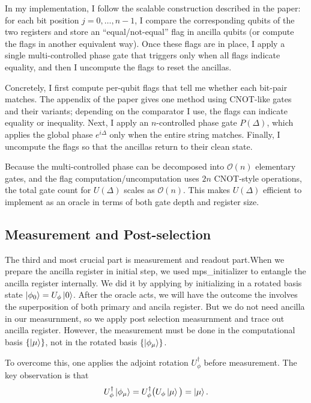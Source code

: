 \documentclass[12pt,a4paper]{article}
\begin{document}
\setlength{\parskip}{1em}
In my implementation, I follow the scalable construction described in the paper: for each bit position $j = 0, \dots, n-1$, I compare the corresponding qubits of the two registers and store an ``equal/not-equal'' flag in ancilla qubits (or compute the flags in another equivalent way). Once these flags are in place, I apply a single multi-controlled phase gate that triggers only when all flags indicate equality, and then I uncompute the flags to reset the ancillas.  

Concretely, I first compute per-qubit flags that tell me whether each bit-pair matches. The appendix of the paper gives one method using CNOT-like gates and their variants; depending on the comparator I use, the flags can indicate equality or inequality. Next, I apply an $n$-controlled phase gate $P(\Delta)$, which applies the global phase $e^{i\Delta}$ only when the entire string matches. Finally, I uncompute the flags so that the ancillas return to their clean state.  

Because the multi-controlled phase can be decomposed into $\mathcal{O}(n)$ elementary gates, and the flag computation/uncomputation uses $2n$ CNOT-style operations, the total gate count for $U(\Delta)$ scales as $\mathcal{O}(n)$. This makes $U(\Delta)$ efficient to implement as an oracle in terms of both gate depth and register size.

\newpage
\subsection{Measurement and Post-selection}

The third and most crucial part is measurement and readout part.When we prepare the ancilla register in initial step, we used mps\_initializer to entangle the ancilla register internally. We did it by applying by initializing in a rotated basis state 
$\ket{\phi_0} = U_\phi \ket{0}$. After the oracle acts, we will have the outcome the involves the superposition of both primary and ancila register. But we do not need ancilla in our measurnment, so we apply post selection measurnment and trace out ancilla register.
However, the measurement must be done in the computational basis $\{\ket{\mu}\}$, not in the rotated basis $\{\ket{\phi_\mu}\}$.

To overcome this, one applies the adjoint rotation $U_\phi^\dagger$ before measurement. The key observation is that 
\[
U_\phi^\dagger \ket{\phi_\mu} = U_\phi^\dagger \big( U_\phi \ket{\mu} \big) = \ket{\mu}.
\]
\end{document}
